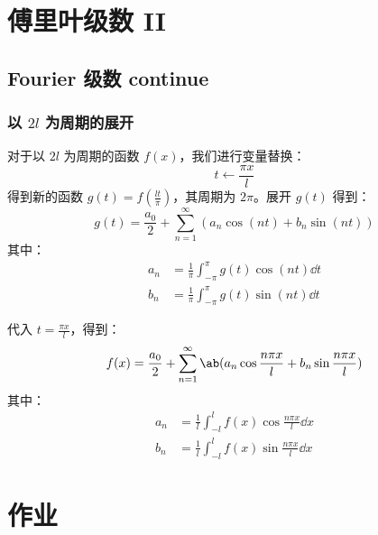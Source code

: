 \section{傅里叶级数 II}

\subsection{Fourier 级数 continue}

\subsubsection{以 $2l$ 为周期的展开}

对于以 $2l$ 为周期的函数 $f(x)$，我们进行变量替换：
$$
t \gets \frac{\pi x}{l}
$$
得到新的函数 $g(t) = f(\frac{lt}{\pi})$，其周期为 $2\pi$。展开 $g(t)$ 得到：
$$
g(t) = \frac{a_0}{2} + \sum_{n=1}^{\infty} (a_n \cos(nt) + b_n \sin(nt))
$$
其中：
$$
\begin{aligned}
    a_n & = \frac{1}{\pi} \int_{-\pi}^{\pi} g(t) \cos(nt) \dd{t} \\
    b_n & = \frac{1}{\pi} \int_{-\pi}^{\pi} g(t) \sin(nt) \dd{t}
\end{aligned}
$$

代入 $t = \frac{\pi x}{l}$，得到：
$$
f(x) = \frac{a_0}{2} + \sum_{n=1}^{\infty} \ab(a_n \cos \frac{n\pi x}{l} + b_n \sin \frac{n\pi x}{l})
$$
其中：
$$
\begin{aligned}
    a_n & = \frac{1}{l} \int_{-l}^{l} f(x) \cos \frac{n\pi x}{l} \dd{x} \\
    b_n & = \frac{1}{l} \int_{-l}^{l} f(x) \sin \frac{n\pi x}{l} \dd{x}
\end{aligned}
$$

\section{作业}


